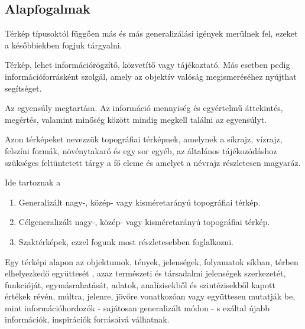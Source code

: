 		\subsection{Alapfogalmak}
		Térkép típusoktól függően más és más generalizálási igények merülnek fel, ezeket a későbbiekben fogjuk tárgyalni.

		\begin{definition}
			Térkép, lehet információrögzítő, közvetítő vagy tájékoztató. Más esetben pedig információforrásként szolgál,
			amely az objektív valóság megismeréséhez nyújthat segítséget.
		\end{definition}

		\begin{definition}
			Az egyensúly megtartása. Az információ mennyiség és egyértelmű áttekintés, megértés, valamint minőség között
			mindig megkell találni az egyensúlyt.
		\end{definition}
		
  	    \begin{definition}
		  	Azon térképeket nevezzük topográfiai térképnek, amelynek a síkrajz, vízrajz, felszíni formák,
		növénytakaró és egy sor egyéb, az általános tájékozódáshoz szükséges feltüntetett tárgy a fő eleme és
		amelyet a névrajz részletesen magyaráz.
		  \end{definition}
		  Ide tartoznak a 
			\begin{enumerate}
				\item Generalizált nagy-, közép- vagy kisméretarányú topográfiai térkép.
				\item Célgeneralizált nagy-, közép- vagy kisméretarányú topográfiai térkép.
				\item Szaktérképek, ezzel fogunk most részletesebben foglalkozni.
		\end{enumerate}

		\begin{definition}[Szaktérképek]
			Egy térképi alapon az objektumok, tények, jelenségek, folyamatok síkban, térben elhelyezkedő együttesét
			, azaz természeti és társadalmi jelenségek szerkezetét, funkcióját, egymásrahatását, adatok, analízisekből és
			szintézisekből kapott értékek révén, múltra, jelenre, jövőre vonatkozóan vagy együttesen mutatják be, mint információhordozók
			- sajátosan generalizált módon - s ezáltal újabb információk, inspirációk forrásaivá válhatnak.
		\end{definition}

		
